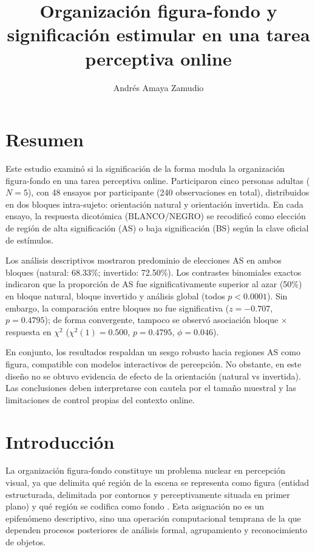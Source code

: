 \documentclass[stu, 12pt, letterpaper, donotrepeattitle, floatsintext, natbib]{apa7}
\title{\Large Organización figura-fondo y significación estimular en una tarea perceptiva online}
\author{Andrés Amaya Zamudio}
\affiliation{UNED Centro Asociado de Móstoles}
\begin{document}
\maketitle


\section*{Resumen}
Este estudio examinó si la significación de la forma modula la organización figura-fondo en una tarea perceptiva online. Participaron cinco personas adultas (\(N=5\)), con 48 ensayos por participante (240 observaciones en total), distribuidos en dos bloques intra-sujeto: orientación natural y orientación invertida. En cada ensayo, la respuesta dicotómica (BLANCO/NEGRO) se recodificó como elección de región de alta significación (AS) o baja significación (BS) según la clave oficial de estímulos.

Los análisis descriptivos mostraron predominio de elecciones AS en ambos bloques (natural: 68.33\%; invertido: 72.50\%). Los contrastes binomiales exactos indicaron que la proporción de AS fue significativamente superior al azar (50\%) en bloque natural, bloque invertido y análisis global (todos \(p < 0.0001\)). Sin embargo, la comparación entre bloques no fue significativa (\(z=-0.707\), \(p=0.4795\)); de forma convergente, tampoco se observó asociación bloque \(\times\) respuesta en \(\chi^2\) (\(\chi^2(1)=0.500\), \(p=0.4795\), \(\phi=0.046\)).

En conjunto, los resultados respaldan un sesgo robusto hacia regiones AS como figura, compatible con modelos interactivos de percepción. No obstante, en este diseño no se obtuvo evidencia de efecto de la orientación (natural vs invertida). Las conclusiones deben interpretarse con cautela por el tamaño muestral y las limitaciones de control propias del contexto online.

\section{Introducción}

La organización figura-fondo constituye un problema nuclear en percepción visual, ya que delimita qué región de la escena se representa como figura (entidad estructurada, delimitada por contornos y perceptivamente situada en primer plano) y qué región se codifica como fondo \citep{rubin1915,peterson1994must,vecera1998interactive}. Esta asignación no es un epifenómeno descriptivo, sino una operación computacional temprana de la que dependen procesos posteriores de análisis formal, agrupamiento y reconocimiento de objetos.
\end{document}
